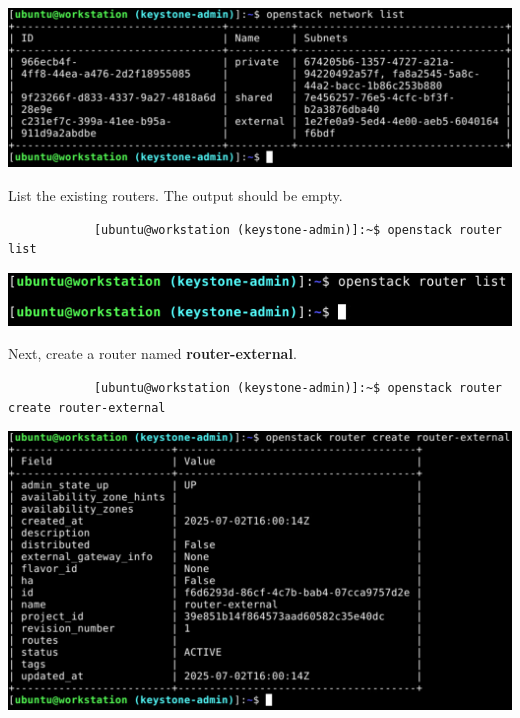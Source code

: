 \documentclass[letterpaper, 12pt]{article}
\begin{document}
\begin{enumerate}
\begin{labstep}
        \begin{center}
            \includegraphics[width=\linewidth]{images/part9/step12.png}
        \end{center}
    \end{labstep}

    \begin{labstep}
        List the existing routers.
        The output should be empty.
        \begin{lstlisting}
            [ubuntu@workstation (keystone-admin)]:~$ openstack router list
        \end{lstlisting}

        \begin{center}
            \includegraphics[width=\linewidth]{images/part9/step13.png}
        \end{center}
    \end{labstep}

    \begin{labstep}
        Next, create a router named \textbf{router-external}.
        \begin{lstlisting}
            [ubuntu@workstation (keystone-admin)]:~$ openstack router create router-external
        \end{lstlisting}

        \begin{center}
            \includegraphics[width=\linewidth]{images/part9/step14.png}
        \end{center}
    \end{labstep}


\end{enumerate}
\end{document}
